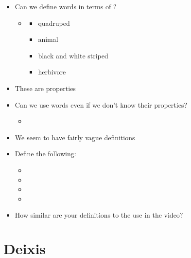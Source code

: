 \documentclass[headrule,footrule]{foils}
\begin{document}

\begin{itemize}
\item Can we define words in terms of ?
  \begin{itemize}
  \item {}
    \begin{itemize}
    \item quadruped
    \item animal 
    \item black and white striped
    \item herbivore
    \end{itemize}
  \end{itemize}
\item These are  properties
\item Can we use words even if we don't know their properties?
  \begin{itemize}
  \item {}
  \end{itemize}
\item We seem to have fairly vague definitions
\end{itemize}


\begin{itemize}
\item Define the following:
  \begin{itemize}
  \item {}
  \item {}
  \item {}
  \item {}
  \end{itemize}
\item How similar are your definitions to the use in the video?
\end{itemize}



\section{Deixis}
\end{document}
